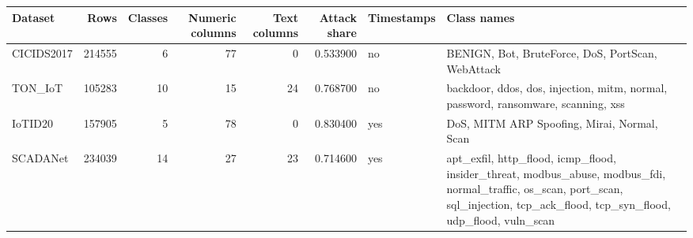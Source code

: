 \begin{tabular}{lrrrrrll}
\toprule
Dataset & Rows & Classes & Numeric columns & Text columns & Attack share & Timestamps & Class names \\
\midrule
CICIDS2017 & 214555 & 6 & 77 & 0 & 0.533900 & no & BENIGN, Bot, BruteForce, DoS, PortScan, WebAttack \\
TON\_IoT & 105283 & 10 & 15 & 24 & 0.768700 & no & backdoor, ddos, dos, injection, mitm, normal, password, ransomware, scanning, xss \\
IoTID20 & 157905 & 5 & 78 & 0 & 0.830400 & yes & DoS, MITM ARP Spoofing, Mirai, Normal, Scan \\
SCADANet & 234039 & 14 & 27 & 23 & 0.714600 & yes & apt\_exfil, http\_flood, icmp\_flood, insider\_threat, modbus\_abuse, modbus\_fdi, normal\_traffic, os\_scan, port\_scan, sql\_injection, tcp\_ack\_flood, tcp\_syn\_flood, udp\_flood, vuln\_scan \\
\bottomrule
\end{tabular}
